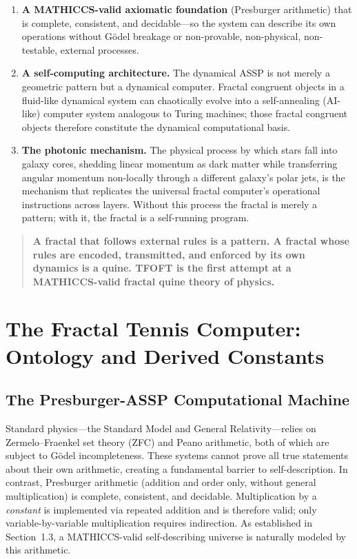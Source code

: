 \documentclass[11pt,a4paper]{article}
\begin{document}
\begin{enumerate}
  \item \textbf{A MATHICCS-valid axiomatic foundation} (Presburger arithmetic) that is complete, consistent, and decidable---so the system can describe its own operations without Gödel breakage or non-provable, non-physical, non-testable, external processes.

  \item \textbf{A self-computing architecture.} The dynamical ASSP is not merely a geometric pattern but a dynamical computer. Fractal congruent objects in a fluid-like dynamical system can chaotically evolve into a self-annealing (AI-like) computer system analogous to Turing machines; those fractal congruent objects therefore constitute the dynamical computational basis.

  \item \textbf{The photonic mechanism.} The physical process by which stars fall into galaxy cores, shedding linear momentum as dark matter while transferring angular momentum non-locally through a different galaxy's polar jets, is the mechanism that replicates the universal fractal computer's operational instructions across layers. Without this process the fractal is merely a pattern; with it, the fractal is a self-running program.
\end{enumerate}

\begin{quote}
\textbf{A fractal that follows external rules is a pattern. A fractal whose rules are encoded, transmitted, and enforced by its own dynamics is a quine. TFOFT is the first attempt at a MATHICCS-valid fractal quine theory of physics.}
\end{quote}


\section{The Fractal Tennis Computer: Ontology and Derived Constants}
\label{sec:ftc}

\subsection{The Presburger-ASSP Computational Machine}

Standard physics---the Standard Model and General Relativity---relies on Zermelo--Fraenkel set theory (ZFC) and Peano arithmetic, both of which are subject to Gödel incompleteness. These systems cannot prove all true statements about their own arithmetic, creating a fundamental barrier to self-description. In contrast, Presburger arithmetic (addition and order only, without general multiplication) is complete, consistent, and decidable. Multiplication by a \emph{constant} is implemented via repeated addition and is therefore valid; only variable-by-variable multiplication requires indirection. As established in Section~1.3, a MATHICCS-valid self-describing universe is naturally modeled by this arithmetic.
\end{document}
